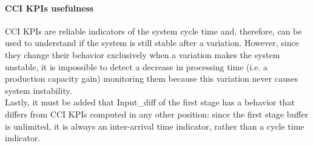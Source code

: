 \paragraph{CCI KPIs usefulness}CCI KPIs are reliable indicators of the system cycle time and, therefore, can be used to understand if the system is still stable after a variation. However, since they change their behavior exclusively when a variation makes the system unstable, it is impossible to detect a decrease in processing time (i.e. a production capacity gain) monitoring them because this variation never causes system instability. \\
Lastly, it must be added that Input\_diff of the first stage has a behavior that differs from CCI KPIs computed in any other position: since the first stage buffer is unlimited, it is always an inter-arrival time indicator, rather than a cycle time indicator.
